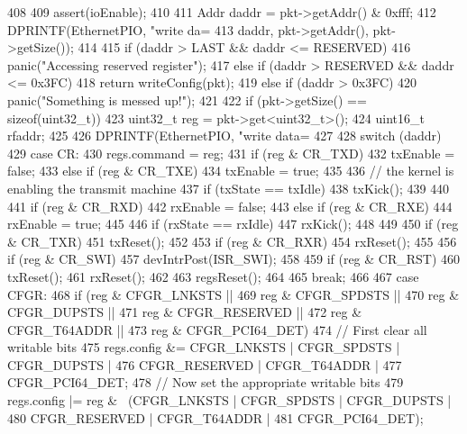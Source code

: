 \begin{DoxyCode}
408 {
409     assert(ioEnable);
410 
411     Addr daddr = pkt->getAddr() & 0xfff;
412     DPRINTF(EthernetPIO, "write da=%
413             daddr, pkt->getAddr(), pkt->getSize());
414 
415     if (daddr > LAST && daddr <=  RESERVED) {
416         panic("Accessing reserved register");
417     } else if (daddr > RESERVED && daddr <= 0x3FC) {
418         return writeConfig(pkt);
419     } else if (daddr > 0x3FC)
420         panic("Something is messed up!\n");
421 
422     if (pkt->getSize() == sizeof(uint32_t)) {
423         uint32_t reg = pkt->get<uint32_t>();
424         uint16_t rfaddr;
425 
426         DPRINTF(EthernetPIO, "write data=%
427 
428         switch (daddr) {
429           case CR:
430             regs.command = reg;
431             if (reg & CR_TXD) {
432                 txEnable = false;
433             } else if (reg & CR_TXE) {
434                 txEnable = true;
435 
436                 // the kernel is enabling the transmit machine
437                 if (txState == txIdle)
438                     txKick();
439             }
440 
441             if (reg & CR_RXD) {
442                 rxEnable = false;
443             } else if (reg & CR_RXE) {
444                 rxEnable = true;
445 
446                 if (rxState == rxIdle)
447                     rxKick();
448             }
449 
450             if (reg & CR_TXR)
451                 txReset();
452 
453             if (reg & CR_RXR)
454                 rxReset();
455 
456             if (reg & CR_SWI)
457                 devIntrPost(ISR_SWI);
458 
459             if (reg & CR_RST) {
460                 txReset();
461                 rxReset();
462 
463                 regsReset();
464             }
465             break;
466 
467           case CFGR:
468             if (reg & CFGR_LNKSTS ||
469                 reg & CFGR_SPDSTS ||
470                 reg & CFGR_DUPSTS ||
471                 reg & CFGR_RESERVED ||
472                 reg & CFGR_T64ADDR ||
473                 reg & CFGR_PCI64_DET) {
474                 // First clear all writable bits
475                 regs.config &= CFGR_LNKSTS | CFGR_SPDSTS | CFGR_DUPSTS |
476                     CFGR_RESERVED | CFGR_T64ADDR |
477                     CFGR_PCI64_DET;
478                 // Now set the appropriate writable bits
479                 regs.config |= reg & ~(CFGR_LNKSTS | CFGR_SPDSTS | CFGR_DUPSTS |
480                                        CFGR_RESERVED | CFGR_T64ADDR |
481                                        CFGR_PCI64_DET);
}}}}
\end{DoxyCode}
